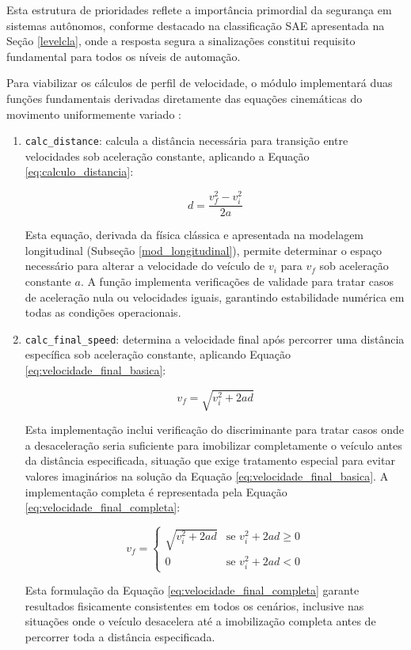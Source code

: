 Esta estrutura de prioridades reflete a importância primordial da segurança em sistemas autônomos, conforme destacado na classificação SAE apresentada na Seção \ref{levelcla}, onde a resposta segura a sinalizações constitui requisito fundamental para todos os níveis de automação.

Para viabilizar os cálculos de perfil de velocidade, o módulo implementará duas funções fundamentais derivadas diretamente das equações cinemáticas do movimento uniformemente variado \cite{University_of_Toronto2018-mp}:

\begin{enumerate}
    \item \texttt{calc\_distance}: calcula a distância necessária para transição entre velocidades sob aceleração constante, aplicando a Equação \ref{eq:calculo_distancia}:
    
    \begin{equation}\label{eq:calculo_distancia}
    d = \frac{v_f^2 - v_i^2}{2a}
    \end{equation}
    
    Esta equação, derivada da física clássica e apresentada na modelagem longitudinal (Subseção \ref{mod_longitudinal}), permite determinar o espaço necessário para alterar a velocidade do veículo de $v_i$ para $v_f$ sob aceleração constante $a$. A função implementa verificações de validade para tratar casos de aceleração nula ou velocidades iguais, garantindo estabilidade numérica em todas as condições operacionais.
    
    \item \texttt{calc\_final\_speed}: determina a velocidade final após percorrer uma distância específica sob aceleração constante, aplicando Equação \ref{eq:velocidade_final_basica}:
    
    \begin{equation}\label{eq:velocidade_final_basica}
    v_f = \sqrt{v_i^2 + 2ad}
    \end{equation}
    
    Esta implementação inclui verificação do discriminante para tratar casos onde a desaceleração seria suficiente para imobilizar completamente o veículo antes da distância especificada, situação que exige tratamento especial para evitar valores imaginários na solução da Equação \ref{eq:velocidade_final_basica}. A implementação completa é representada pela Equação \ref{eq:velocidade_final_completa}:
    
    \begin{equation}\label{eq:velocidade_final_completa}
    v_f = 
    \begin{cases}
    \sqrt{v_i^2 + 2ad} & \text{se } v_i^2 + 2ad \geq 0 \\
    0 & \text{se } v_i^2 + 2ad < 0
    \end{cases}
    \end{equation}
    
    Esta formulação da Equação \ref{eq:velocidade_final_completa} garante resultados fisicamente consistentes em todos os cenários, inclusive nas situações onde o veículo desacelera até a imobilização completa antes de percorrer toda a distância especificada.
\end{enumerate}

